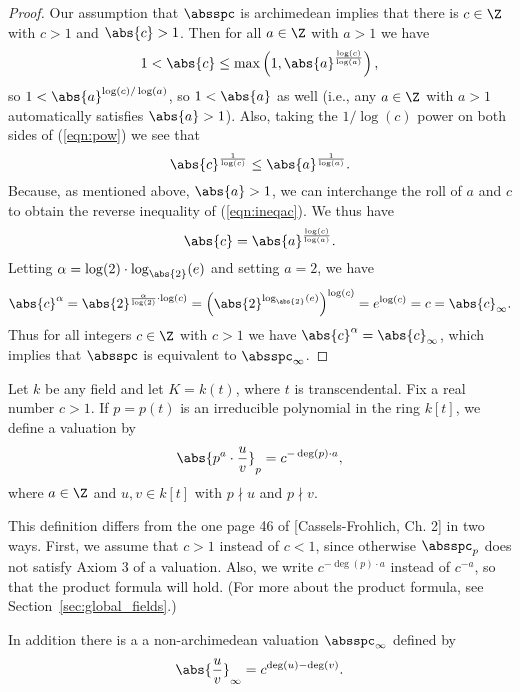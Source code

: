 \documentclass[11pt]{book}
\begin{document}
\begin{ch}
\begin{proof}
Our assumption that $\absspc$ is archimedean implies
that there is $c\in\Z$ with $c>1$ and $\abs{c}>1$.
Then for all $a\in\Z$ with $a>1$ we have
\begin{equation}\label{eqn:pow}
  1 < \abs{c} \leq
  \max\left(1,\abs{a}^{\frac{\log(c)}{\log(a)}}\right),
\end{equation}
so $1<\abs{a}^{\log(c)/\log(a)}$, so
$1<\abs{a}$ as well (i.e., any $a\in\Z$ with
$a>1$ automatically satisfies $\abs{a}>1$).  Also, taking the
$1/\log(c)$ power on both sides of (\ref{eqn:pow})
we see that
\begin{equation}\label{eqn:ineqac}
  \abs{c}^{\frac{1}{\log(c)}}
    \leq   \abs{a}^{\frac{1}{\log(a)}}.
\end{equation}
Because, as mentioned above, $\abs{a}>1$, we can interchange the roll
of $a$ and $c$ to obtain the reverse inequality of (\ref{eqn:ineqac}).
We thus have
$$
  \abs{c}
    =   \abs{a}^{\frac{\log(c)}{\log(a)}}.
$$ Letting $\alpha=\log(2)\cdot \log_{\abs{2}}(e)$ and setting $a=2$,
we have
$$
  \abs{c}^{\alpha} = \abs{2}^{\frac{\alpha}{\log(2)}\cdot \log(c)}
      = \left(\abs{2}^{\log_{\abs{2}}(e)}\right)^{\log(c)} =
   e^{\log(c)} = c = \abs{c}_\infty.
$$
Thus for all integers $c\in\Z$ with $c>1$ we have
$\abs{c}^{\alpha} = \abs{c}_{\infty}$, which implies
that $\absspc$ is equivalent to $\absspc_\infty$.
\end{proof}

Let $k$ be any field and let $K=k(t)$, where $t$
is transcendental.  Fix a real number $c>1$.
If $p=p(t)$ is an irreducible
polynomial in the ring $k[t]$, we define a valuation
by
\begin{equation}\label{eqn:ffabsp}
  \abs{p^a \cdot \frac{u}{v}}_p = c^{-\deg(p)\cdot a},
\end{equation}
where $a\in\Z$ and $u,v\in k[t]$ with
$p\nmid u$ and $p\nmid v$.
\begin{remark}
This definition differs from the one page 46 of [Cassels-Frohlich,
Ch. 2] in two ways.   First, we assume that $c>1$ instead
of $c<1$, since otherwise $\absspc_p$ does not satisfy
Axiom 3 of a valuation.  Also, we write $c^{-\deg(p)\cdot a}$
instead of $c^{-a}$, so that the product formula will
hold.  (For more about the product formula, see
Section~\ref{sec:global_fields}.)
\end{remark}
In addition there is a a non-archimedean valuation
$\absspc_\infty$ defined by
\begin{equation}\label{eqn:ffabsoo}
  \abs{\frac{u}{v}}_\infty = c^{\deg(u)-\deg(v)}.
\end{equation}



\end{ch}
\end{document}
